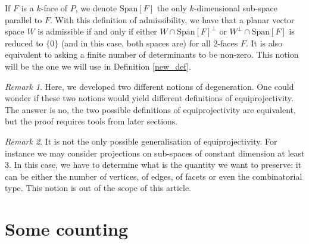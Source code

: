 \documentclass[12pt, notitlepage]{article}
\theoremstyle{plain}
\theoremstyle{definition}
\theoremstyle{plain}
\theoremstyle{remark}
\newtheorem*{rmk}{Remark}
\theoremstyle{plain}
\theoremstyle{plain}
\newcommand{\vect}{\text{Span}}
\begin{document}
If $F$ is a $k$-face of $P$, we denote $\vect[F]$ the only $k$-dimensional sub-space parallel to $F$. With this definition of admissibility, we have that a planar vector space $W$ is admissible if and only if either $W \cap \vect[F]^\perp$ or $W^\perp \cap \vect[F]$ is reduced to $\{0\}$ (and in this case, both spaces are) for all 2-faces $F$. It is also equivalent to asking a finite number of determinants to be non-zero. This notion will be the one we will use in Definition \ref{new_def}.

\begin{rmk}
    Here, we developed two different notions of degeneration. One could wonder if these two notions would yield different definitions of equiprojectivity. The answer is no, the two possible definitions of equiprojectivity are equivalent, but the proof requires tools from later sections.
\end{rmk}

\begin{rmk}
    It is not the only possible generalisation of equiprojectivity. For instance we may consider projections on sub-spaces of constant dimension at least 3. In this case, we have to determine what is the quantity we want to preserve: it can be either the number of vertices, of edges, of facets or even the combinatorial type. This notion is out of the scope of this article.
\end{rmk}

\section{Some counting}
\end{document}
